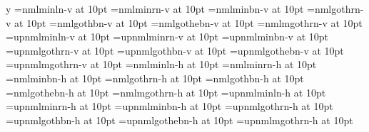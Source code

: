 \if y\USEOTF
\ifx\MAPSETJP\undefined\else\shipout\vbox{\DIR\ADJUST
  \iftdir
    \ifx\ucs\undefined
      \tfont\x=nmlminln-v at 10pt\x\TESTJP
      \tfont\x=nmlminrn-v at 10pt\x\TESTJP
      \tfont\x=nmlminbn-v at 10pt\x\TESTJP
      \tfont\x=nmlgothrn-v at 10pt\x\TESTJP
      \tfont\x=nmlgothbn-v at 10pt\x\TESTJP
      \tfont\x=nmlgothebn-v at 10pt\x\TESTJP
      \tfont\x=nmlmgothrn-v at 10pt\x\TESTJP
    \else
      \tfont\x=upnmlminln-v at 10pt\x\TESTJP
      \tfont\x=upnmlminrn-v at 10pt\x\TESTJP
      \tfont\x=upnmlminbn-v at 10pt\x\TESTJP
      \tfont\x=upnmlgothrn-v at 10pt\x\TESTJP
      \tfont\x=upnmlgothbn-v at 10pt\x\TESTJP
      \tfont\x=upnmlgothebn-v at 10pt\x\TESTJP
      \tfont\x=upnmlmgothrn-v at 10pt\x\TESTJP
    \fi
  \else
    \ifx\ucs\undefined
      \tfont\x=nmlminln-h at 10pt\x\TESTJP
      \tfont\x=nmlminrn-h at 10pt\x\TESTJP
      \tfont\x=nmlminbn-h at 10pt\x\TESTJP
      \tfont\x=nmlgothrn-h at 10pt\x\TESTJP
      \tfont\x=nmlgothbn-h at 10pt\x\TESTJP
      \tfont\x=nmlgothebn-h at 10pt\x\TESTJP
      \tfont\x=nmlmgothrn-h at 10pt\x\TESTJP
    \else
      \tfont\x=upnmlminln-h at 10pt\x\TESTJP
      \tfont\x=upnmlminrn-h at 10pt\x\TESTJP
      \tfont\x=upnmlminbn-h at 10pt\x\TESTJP
      \tfont\x=upnmlgothrn-h at 10pt\x\TESTJP
      \tfont\x=upnmlgothbn-h at 10pt\x\TESTJP
      \tfont\x=upnmlgothebn-h at 10pt\x\TESTJP
      \tfont\x=upnmlmgothrn-h at 10pt\x\TESTJP
    \fi
  \fi
}\fi
\fi

\bye
